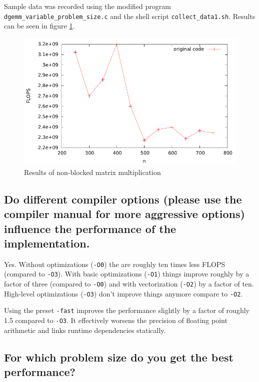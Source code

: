 \documentclass[11pt]{article}
\begin{document}
Sample data was recorded using the modified program \texttt{dgemm\_variable\_problem\_size.c} and the shell script \texttt{collect\_data1.sh}. Results can be seen in figure \ref{unblocked}.

\begin{figure}[h]
  \begin{center}
    \includegraphics{graph_unblocked.pdf}
    \caption{Results of non-blocked matrix multiplication}
    \label{unblocked}
  \end{center}
\end{figure}

\subsection*{Do different compiler options (please use the compiler manual for more aggressive options) influence the performance of the implementation.}

Yes. Without optimizations (\texttt{-O0}) the are roughly ten times less FLOPS (compared to \texttt{-O3}). With basic optimizations (\texttt{-O1}) things improve roughly by a factor of three (compared to \texttt{-O0}) and with vectorization (\texttt{-O2}) by a factor of ten. High-level optimizations (\texttt{-O3}) don't improve things anymore compare to \texttt{-O2}.

Using the preset \texttt{-fast} improves the performance slightly by a factor of roughly 1.5 compared to \texttt{-O3}. It effectively worsens the precision of floating point arithmetic and links runtime dependencies statically.

\subsection*{For which problem size do you get the best performance?}
\end{document}

